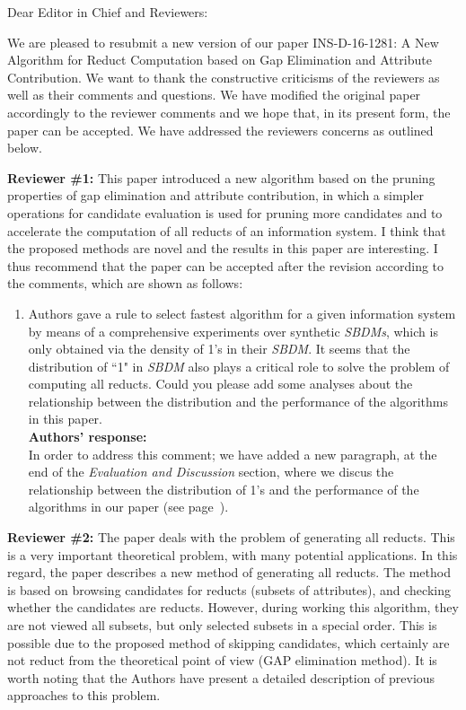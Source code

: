 \documentclass{letter}
\begin{document}
\begin{letter}{}
  \opening{Dear Editor in Chief and Reviewers:}

  We are pleased to resubmit a new version of our paper INS-D-16-1281: A New Algorithm for Reduct Computation based on Gap Elimination and Attribute Contribution. We want to thank the constructive criticisms of the reviewers as well as their comments and questions. We have modified the original paper accordingly to the reviewer comments and we hope that, in its present form, the paper can be accepted. We have addressed the reviewers concerns as outlined below.

  \textbf{Reviewer \#1:} 
  This paper introduced a new algorithm based on the pruning properties of gap elimination and attribute contribution, in which a simpler operations for candidate evaluation is used for pruning more candidates and to accelerate the computation of all reducts of an information system. I think that the proposed methods are novel and the results in this paper are interesting. I thus recommend that the paper can be accepted after the revision according to the comments, which are shown as follows:

  \begin{enumerate}
    \item Authors gave a rule to select fastest algorithm for a given information system by means of a comprehensive experiments over synthetic \textit{SBDMs}, which is only obtained via the density of 1's in their \textit{SBDM}. It seems that the distribution of ``1" in \textit{SBDM} also plays a critical role to solve the problem of computing all reducts. Could you please add some analyses about the relationship between the distribution and the performance of the algorithms in this paper.\\
    \textbf{Authors’ response:} \\
    In order to address this comment; we have added a new paragraph, at the end of the \textit{Evaluation and Discussion} section, where we discus the relationship between the distribution of 1's and the performance of the algorithms in our paper (see page~\pageref{par:distribution}).
  \end{enumerate}
  
  \textbf{Reviewer \#2:}
  The paper deals with the problem of generating all reducts. This is a very important theoretical problem, with many potential applications. In this regard, the paper describes a new method of generating all reducts. The method is based on browsing candidates for reducts (subsets of attributes), and checking whether the candidates are reducts. However, during working this algorithm, they are not viewed all subsets, but only selected subsets in a special order. This is possible due to the proposed method of skipping candidates, which certainly are not reduct from the theoretical point of view (GAP elimination method).
  It is worth noting that the Authors have present a detailed description of previous approaches to this problem.
  

\end{letter}
\end{document}
